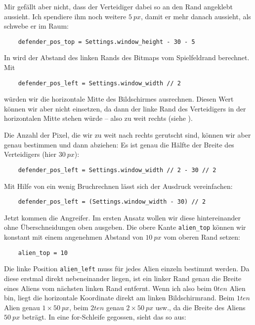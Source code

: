 Mir gefällt aber nicht, dass der Verteidiger dabei so an den Rand angeklebt aussieht. Ich spendiere ihm noch weitere $5~px$, damit er mehr danach aussieht, als schwebe er im Raum:

\lstset{firstnumber=24}
\begin{lstlisting}
	defender_pos_top = Settings.window_height - 30 - 5
\end{lstlisting}

In  wird der Abstand des linken Rands des Bitmaps vom Spielfeldrand berechnet. Mit

\lstset{firstnumber=23}
\begin{lstlisting}
	defender_pos_left = Settings.window_width // 2
\end{lstlisting}

würden wir die horizontale Mitte des Bildschirmes ausrechnen. Diesen Wert können wir aber nicht einsetzen, da dann der linke Rand des Verteidigers in der horizontalen Mitte stehen würde -- also zu weit rechts (siehe ). 


Die Anzahl der Pixel, die wir zu weit nach rechts gerutscht sind, können wir aber genau bestimmen und dann abziehen: Es ist genau die Hälfte der Breite des Verteidigers (hier $30~px$):
\begin{lstlisting}
	defender_pos_left = Settings.window_width // 2 - 30 // 2
\end{lstlisting}

Mit Hilfe von ein wenig Bruchrechnen lässt sich der Ausdruck vereinfachen:
\begin{lstlisting}
	defender_pos_left = (Settings.window_width - 30) // 2
\end{lstlisting}

Jetzt kommen die Angreifer. Im ersten Ansatz wollen wir diese hintereinander ohne Überschneidungen oben ausgeben. Die obere Kante \texttt{alien\_top} können wir konstant mit einem angenehmen Abstand von $10~px$ vom oberen Rand setzen:

\lstset{firstnumber=44}
\begin{lstlisting}
	alien_top = 10 
\end{lstlisting}

Die linke Position \texttt{alien\_left} muss für jedes Alien einzeln bestimmt werden. Da diese erstmal direkt nebeneinander liegen, ist ein linker Rand genau die Breite eines Aliens vom nächsten linken Rand entfernt. Wenn ich also beim $0ten$ Alien bin, liegt die horizontale Koordinate direkt am linken Bildschirmrand. Beim $1ten$ Alien genau $1\times50~px$, beim $2ten$ genau $2\times50~px$ usw., da die Breite des Aliens $50~px$ beträgt. In eine for-Schleife gegossen, sieht das so aus:

